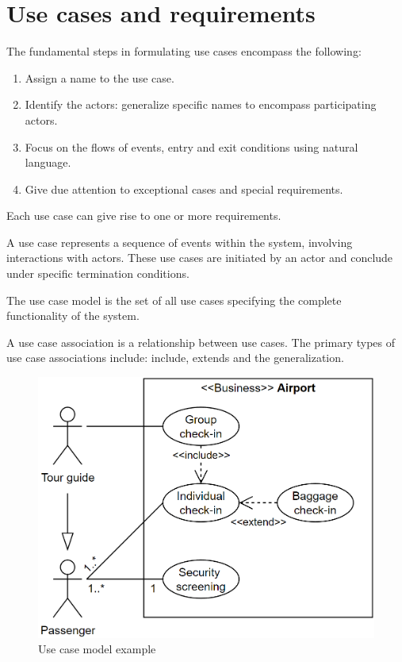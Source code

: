 \section{Use cases and requirements}

The fundamental steps in formulating use cases encompass the following:
\begin{enumerate}
    \item Assign a name to the use case.
    \item Identify the actors: generalize specific names to encompass participating actors.
    \item Focus on the flows of events, entry and exit conditions using natural language.
    \item Give due attention to exceptional cases and special requirements.
\end{enumerate}
Each use case can give rise to one or more requirements.
 
A use case represents a sequence of events within the system, involving interactions with actors. 
These use cases are initiated by an actor and conclude under specific termination conditions.
\begin{definition}
    The use case model is the set of all use cases specifying the complete functionality of the system. 
\end{definition}
\begin{definition}
    A use case association is a relationship between use cases. 
    The primary types of use case associations include: include, extends and the generalization.
\end{definition}
\begin{figure}[H]
    \centering
    \includegraphics[width=0.5\linewidth]{images/usecase.png}
    \caption{Use case model example}
\end{figure}